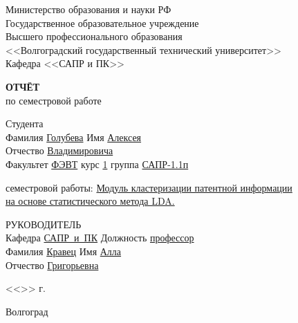 \begin{titlepage}
    \begin{center}
        Министерство образования и науки РФ \\
        Государственное образовательное учреждение\\
        Высшего профессионального образования\\
        <<Волгоградский государственный технический университет>>\\
        Кафедра <<САПР и ПК>>
    \end{center}
    \vspace{2.0cm}
    \begin{center}
        \large \textbf{ОТЧЁТ} \\
        по семестровой работе
    \end{center}
    \begin{flushleft}
        Студента\\
        Фамилия \underline{Голубева\hspace{3.1cm}} 
        Имя \underline{Алексея\hspace{2.1cm}}\\
        Отчество \underline{Владимировича\hspace{1.6cm}}\\
        Факультет \underline{ФЭВТ\hspace{3.45cm}} курс \underline{1\hspace{1.5cm}} 
        группа \underline{САПР-1.1п\hspace{1.9cm}}\\
    \end{flushleft}
    \vspace{1.0cm}
     семестровой работы: \underline{Модуль кластеризации патентной информации}\\
    \underline{на основе статистического метода LDA.\hspace{7.4cm}}
    \vspace{2.0cm}
    \begin{flushleft}
        РУКОВОДИТЕЛЬ\\
        Кафедра \underline{САПР~и~ПК\hspace{2.4cm}} Должность \underline{профессор\hspace{2.8cm}} \\
        Фамилия \underline{Кравец\hspace{3.3cm}} Имя \underline{Алла\hspace{5.5cm}}\\
        Отчество \underline{Григорьевна\hspace{2.2cm}}
    \end{flushleft}
    \vspace{1.5cm}
    \begin{flushright}
        <<\underline{\hspace{1.0cm}}>>\underline{\hspace{4.0cm}} \the\year г.
    \end{flushright}
    \vspace{\fill}
    \begin{center}
        Волгоград \the\year
    \end{center}
\end{titlepage}
